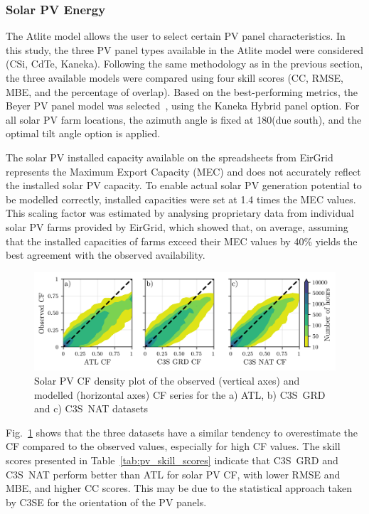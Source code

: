 \documentclass[preprint, 12pt]{elsarticle}
\begin{document}
\subsubsection{Solar PV Energy}
\label{sec:pv_verification}

The Atlite model allows the user to select certain PV panel characteristics. In this study, the three PV panel types available in the Atlite model were considered (CSi, CdTe, Kaneka). Following the same methodology as in the previous section, the three available models were compared using four skill scores (CC, RMSE, MBE, and the percentage of overlap). Based on the best-performing metrics, the Beyer PV panel model was selected~\citep{beyer2004pv}, using the Kaneka Hybrid panel option. For all solar PV farm locations, the azimuth angle is fixed at 180\textdegree (due south), and the optimal tilt angle option is applied. 

The solar PV installed capacity available on the spreadsheets from EirGrid represents the Maximum Export Capacity (MEC) and does not accurately reflect the installed solar PV capacity. To enable actual solar PV generation potential to be modelled correctly, installed capacities were set at 1.4 times the MEC values. This scaling factor was estimated by analysing proprietary data from individual solar PV farms provided by EirGrid, which showed that, on average, assuming that the installed capacities of farms exceed their MEC values by 40\% yields the best agreement with the observed availability.

\begin{figure}[h!]
	\centering
	\includegraphics[width=\textwidth]{verification_pv_contour.png}
	\caption{Solar PV CF density plot of the observed (vertical axes) and modelled (horizontal axes) CF series for the a) ATL, b) C3S~GRD and c) C3S~NAT datasets}	
	\label{fig:solar_verification_contour}
\end{figure}

Fig.~\ref{fig:solar_verification_contour} shows that the three datasets have a similar tendency to overestimate the CF compared to the observed values, especially for high CF values. The skill scores presented in Table~\ref{tab:pv_skill_scores} indicate that C3S~GRD and C3S~NAT perform better than ATL for solar PV CF, with lower RMSE and MBE, and higher CC scores. This may be due to the statistical approach taken by C3SE for the orientation of the PV panels.
\end{document}
